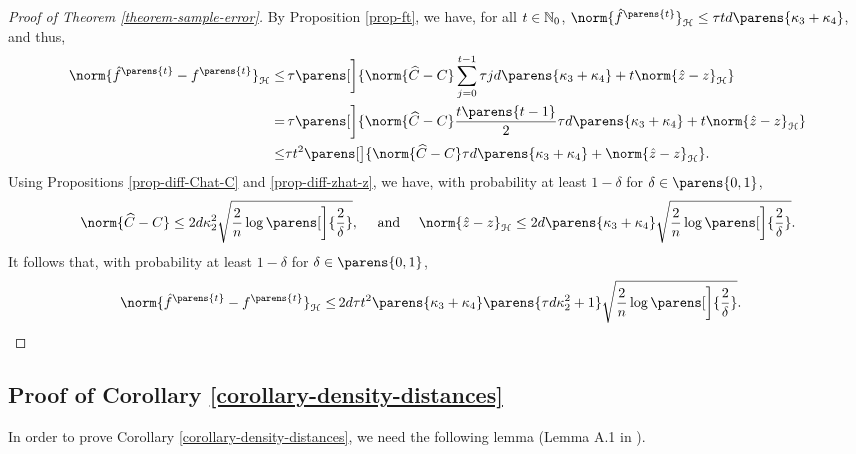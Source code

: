 \begin{proof}[Proof of Theorem \ref{theorem-sample-error}]
	By Proposition \ref{prop-ft}, we have, for all $t \in \mathbb{N}_0$, $\norm{\hat{f}^{\parens{t}}}_{\hil} \le \tau t d \parens{\kappa_3 + \kappa_4}$, and thus, 
	\begin{align*}
		\norm{\hat{f}^{\parens{t}} - f^{\parens{t}}}_{\calH} \le & \, \tau \parens[\bigg]{\norm{\widehat{C} - C} \sum_{j=0}^{t-1} \tau j d \parens{\kappa_3 + \kappa_4} + t \norm{\hat{z} - z}_{\calH}} \\
		= & \, \tau \parens[\bigg]{\norm{\widehat{C} - C} \frac{t \parens{t-1}}{2} \tau d \parens{\kappa_3 + \kappa_4} + t \norm{\hat{z} - z}_{\calH}} \\ 
		\le & \tau t^2 \parens[\big]{\norm{\widehat{C} - C} \tau d \parens{\kappa_3 + \kappa_4} + \norm{\hat{z} - z}_{\hil}}. 
	\end{align*}
	Using Propositions \ref{prop-diff-Chat-C} and \ref{prop-diff-zhat-z}, we have, with probability at least $1 - \delta$ for $\delta \in \parens{0, 1}$, 
	\begin{align*}
		\norm{\widehat{C} - C} \le 2d \kappa_2^2 \sqrt{\frac{2}{n} \log \parens[\bigg]{\frac{2}{\delta}}}, \quad \text{ and } \quad \norm{\hat{z} - z}_{\calH} \le 2 d \parens{\kappa_3 + \kappa_4} \sqrt{\frac{2}{n} \log \parens[\bigg]{\frac{2}{\delta}}}. 
	\end{align*}
	It follows that, with probability at least $1 - \delta$ for $\delta \in \parens{0, 1}$, 
	\begin{align*}
		\norm{\hat{f}^{\parens{t}} - f^{\parens{t}}}_{\hil} \le & \, 2 d \tau t^2 \parens{\kappa_3 + \kappa_4} \parens{\tau d \kappa_2^2 + 1} \sqrt{\frac{2}{n} \log \parens[\bigg]{\frac{2}{\delta}}}. 
	\end{align*}
\end{proof}


\subsection{Proof of Corollary \ref{corollary-density-distances}}\label{proof-corollary-density-distances}

In order to prove Corollary \ref{corollary-density-distances}, we need the following lemma (Lemma A.1 in \cite{Sriperumbudur-density-estimation-inf-exp-family}). 

